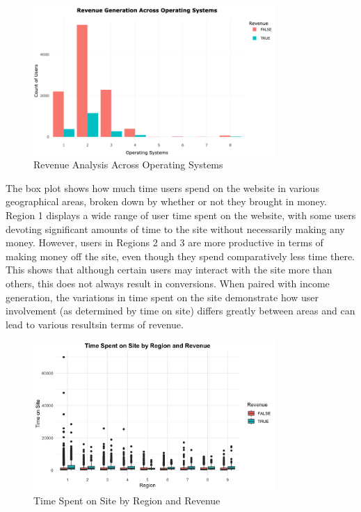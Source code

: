 \documentclass[12pt]{article}
\begin{document}
\begin{figure}[h]
    \centering
    \includegraphics[width=0.82\textwidth]{Revenue Generation Across Operating Systems.png}  
    \caption{Revenue Analysis Across Operating Systems}
\end{figure}
\vspace{0.5cm}

\FloatBarrier
The box plot shows how much time users spend on the website in various geographical areas, broken down by whether or not they brought in money. Region 1 displays a wide range of user time spent on the website, with some users devoting significant amounts of time to the site without necessarily making any money. However, users in Regions 2 and 3 are more productive in terms of making money off the site, even though they spend comparatively less time there. This shows that although certain users may interact with the site more than others, this does not always result in conversions. When paired with income generation, the variations in time spent on the site demonstrate how user involvement (as determined by time on site) differs greatly between areas and can lead to various resultsin terms of revenue.
\begin{figure}[h]
    \centering
    \includegraphics[width=0.82\textwidth]{Time Spent on Site by Region and Revenue.png}  
    \caption{Time Spent on Site by Region and Revenue}
\end{figure}
\vspace{0.5cm}
\end{document}

